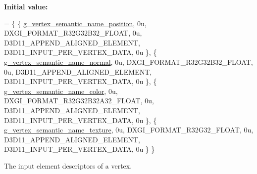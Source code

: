 {\bfseries Initial value\+:}
\begin{DoxyCode}
= \{
        \{ \mbox{\hyperlink{namespacemage_1_1rendering_1_1anonymous__namespace_02vertex_8cpp_03_a6e875b92e4de38b14e8dc404df41a5ad}{g\_vertex\_semantic\_name\_position}}, 0u, DXGI\_FORMAT\_R32G32B32\_FLOAT, 
         0u, D3D11\_APPEND\_ALIGNED\_ELEMENT, D3D11\_INPUT\_PER\_VERTEX\_DATA, 0u \},
        \{ \mbox{\hyperlink{namespacemage_1_1rendering_1_1anonymous__namespace_02vertex_8cpp_03_a1b4bf08af207f8c1681ecf617b094ef3}{g\_vertex\_semantic\_name\_normal}},   0u, DXGI\_FORMAT\_R32G32B32\_FLOAT,   
       0u, D3D11\_APPEND\_ALIGNED\_ELEMENT, D3D11\_INPUT\_PER\_VERTEX\_DATA, 0u \},
        \{ \mbox{\hyperlink{namespacemage_1_1rendering_1_1anonymous__namespace_02vertex_8cpp_03_aae8cd813faec1e62d4e6463db8c99ab5}{g\_vertex\_semantic\_name\_color}},    0u, DXGI\_FORMAT\_R32G32B32A32\_FLOAT, 
      0u, D3D11\_APPEND\_ALIGNED\_ELEMENT, D3D11\_INPUT\_PER\_VERTEX\_DATA, 0u \},
        \{ \mbox{\hyperlink{namespacemage_1_1rendering_1_1anonymous__namespace_02vertex_8cpp_03_a76de570f9dcc80db1e8e2f0a19536085}{g\_vertex\_semantic\_name\_texture}},  0u, DXGI\_FORMAT\_R32G32\_FLOAT,     
        0u, D3D11\_APPEND\_ALIGNED\_ELEMENT, D3D11\_INPUT\_PER\_VERTEX\_DATA, 0u \}
    \}
\end{DoxyCode}
The input element descriptors of a vertex. 